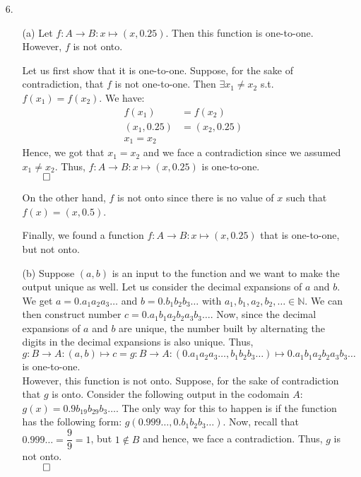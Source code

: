 \documentclass[11pt]{article}
\newcommand{\nats}{\mathbb{N}}
\begin{document}
\begin{itemize}
        \newpage
        \item[6.]
            \begin{itemize}
                \item[(a)]
                    Let $f : A \to B : x \mapsto (x, 0.25)$. Then this function
                    is one-to-one. However, $f$ is not onto.

                    Let us first show that it is one-to-one. Suppose, for the
                    sake of contradiction, that $f$ is not one-to-one. Then
                    $\exists x_1 \neq x_2$ s.t. $f(x_1) = f(x_2)$. We have:
                    \begin{align*}
                        f(x_1)      &= f(x_2)\\
                        (x_1, 0.25) &= (x_2, 0.25)\\
                        x_1 = x_2
                    \end{align*}
                    Hence, we got that $x_1 = x_2$ and we face a contradiction
                    since we assumed $x_1 \neq x_2$. Thus, $f : A \to B : x
                    \mapsto (x, 0.25)$ is one-to-one.\\
                    $\qed$

                    On the other hand, $f$ is not onto since there is no value
                    of $x$ such that $f(x) = (x, 0.5)$.

                    Finally, we found a function $f : A \to B : x \mapsto (x,
                    0.25)$ that is one-to-one, but not onto.

                \item[(b)]
                    Suppose $(a, b)$ is an input to the function and we want to
                    make the output unique as well. Let us consider the decimal
                    expansions of $a$ and $b$. We get $a = 0.a_1a_2a_3\dots$
                    and $b = 0.b_1b_2b_3\dots$ with $a_1, b_1, a_2, b_2, \dots
                    \in \nats$. We can then construct number $c =
                    0.a_1b_1a_2b_2a_3b_3\dots$. Now, since the decimal
                    expansions of $a$ and $b$ are unique, the number built by
                    alternating the digits in the decimal expansions is also
                    unique. Thus, $g : B \to A : (a, b) \mapsto c = g : B \to A
                    : (0.a_1a_2a_3\dots, b_1b_2b_3\dots) \mapsto
                    0.a_1b_1a_2b_2a_3b_3\dots$ is one-to-one.
                    \\
                    However, this function is not onto. Suppose, for the sake
                    of contradiction that $g$ is onto. Consider the following
                    output in the codomain $A$: $g(x) = 0.9b_19b_29b_3\dots$.
                    The only way for this to happen is if the function has the
                    following form: $g(0.999\dots, 0.b_1b_2b_3\dots)$. Now,
                    recall that $0.999\dots = \dfrac{9}{9} = 1$, but $1 \notin
                    B$ and hence, we face a contradiction. Thus, $g$ is not
                    onto.\\
                    $\qed$


\end{itemize}
\end{itemize}
\end{document}
